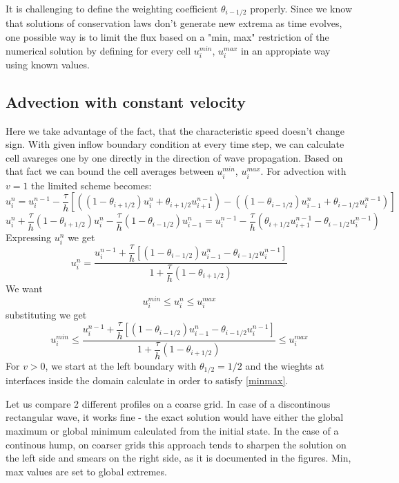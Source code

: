\documentclass{article}
\begin{document}
It is challenging to define the weighting coefficient $ \theta_{i-1/2} $ properly. Since we know that solutions of conservation laws don't generate new extrema as time evolves, one possible way is to limit the flux based on a "min, max" restriction of the numerical solution by defining for every cell $ u_i^{min} $, $ u_i^{max} $ in an appropiate way using known values.

\subsection{Advection with constant velocity}
Here we take advantage of the fact, that the characteristic speed doesn't change sign. With given inflow boundary condition at every time step, we can calculate cell avareges one by one directly in the direction of wave propagation. Based on that fact we can bound the cell averages between $ u_i^{min} $, $ u_i^{max} $.
For advection with $ v = 1 $ the limited scheme becomes:
\[
u_i^{n} = u_i^{n - 1} - 
\frac{\tau}{h}
\left[
\left((1 - \theta_{i+1/2})u^n_{i} + \theta_{i+1/2}u^{n-1}_{i+1}\right) - \left((1 - \theta_{i-1/2})u^n_{i-1} + \theta_{i-1/2}u^{n-1}_{i}\right)
\right]
\]
\[
u_i^{n} + \frac{\tau}{h}(1 - \theta_{i+1/2})u^n_{i} - \frac{\tau}{h}(1 - \theta_{i-1/2})u^n_{i-1} = 
u_i^{n - 1} - 
\frac{\tau}{h}
\left(
 \theta_{i+1/2}u^{n-1}_{i+1} - \theta_{i-1/2}u^{n-1}_{i}
\right)
\]
Expressing $ u^n_{i} $ we get
\begin{equation}
u_i^n = \frac{u_i^{n - 1} + 
	\dfrac{\tau}{h}
	\left[
	(1 - \theta_{i-1/2})u^n_{i-1} - \theta_{i-1/2}u^{n-1}_{i}
	\right]}{1+\dfrac{\tau}{h}(1 - \theta_{i+1/2})}
\end{equation}
We want
\[
u_i^{min} \leq u^n_i \leq u_i^{max} 
\]
substituting we get
\begin{equation}
u_i^{min} \leq
 \frac{u_i^{n - 1} + 
 	\dfrac{\tau}{h}
 	\left[
 	(1 - \theta_{i-1/2})u^n_{i-1} - \theta_{i-1/2}u^{n-1}_{i}
 	\right]}{1+\dfrac{\tau}{h}(1 - \theta_{i+1/2})}
\leq u_i^{max}
\label{minmax}
\end{equation}
For $ v > 0 $, we start at the left boundary with $ \theta_{1 / 2} = 1/2 $ and the wieghts at interfaces inside the domain calculate in order to satisfy \eqref{minmax}.

Let us compare 2 different profiles on a coarse grid. In case of a discontinous rectangular wave, it works fine - the exact solution would have either the global maximum or global minimum calculated from the initial state.
In the case of a continous hump, on coarser grids this approach tends to sharpen the solution on the left side and smears on the right side, as it is documented in the figures. Min, max values are set to global extremes.
\end{document}
